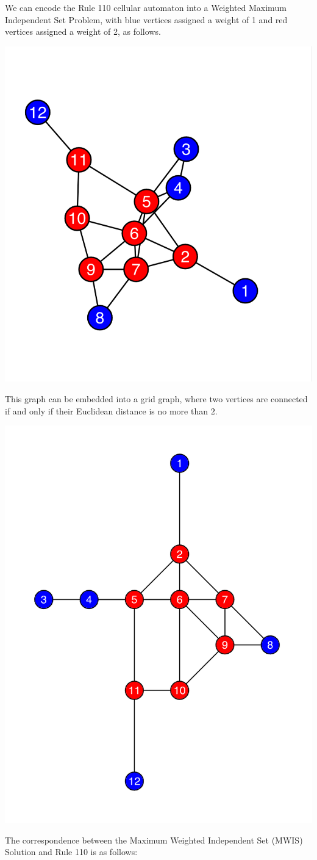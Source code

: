 \documentclass[twocolumn,superscriptaddress,english,showpacs,longbibliography]{revtex4-2}
\begin{document}
We can encode the Rule 110 cellular automaton into a Weighted Maximum
Independent Set Problem, with blue vertices assigned a weight of 1 and
red vertices assigned a weight of 2, as follows.

\includegraphics[width=0.6\columnwidth]{../notes/images/image.png}

This graph can be embedded into a grid graph, where two vertices are
connected if and only if their Euclidean distance is no more than $2$.

\includegraphics[width=0.7\columnwidth]{../notes/images/image-1.png}

The correspondence between the Maximum Weighted Independent Set (MWIS)
Solution and Rule 110 is as follows:
\end{document}
